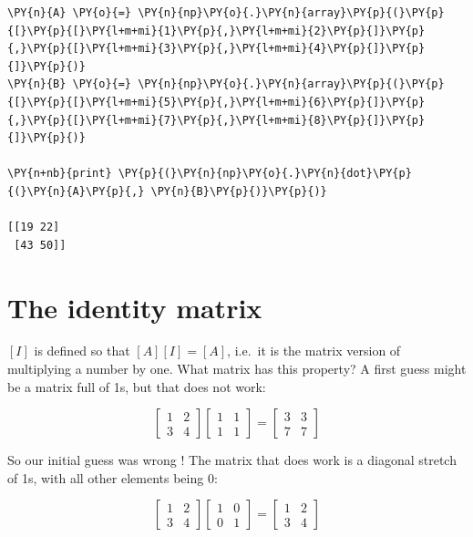 \begin{tcolorbox}[breakable, size=fbox, boxrule=1pt, pad at break*=1mm,colback=cellbackground, colframe=cellborder]
\begin{Verbatim}[commandchars=\\\{\}]
\PY{n}{A} \PY{o}{=} \PY{n}{np}\PY{o}{.}\PY{n}{array}\PY{p}{(}\PY{p}{[}\PY{p}{[}\PY{l+m+mi}{1}\PY{p}{,}\PY{l+m+mi}{2}\PY{p}{]}\PY{p}{,}\PY{p}{[}\PY{l+m+mi}{3}\PY{p}{,}\PY{l+m+mi}{4}\PY{p}{]}\PY{p}{]}\PY{p}{)}
\PY{n}{B} \PY{o}{=} \PY{n}{np}\PY{o}{.}\PY{n}{array}\PY{p}{(}\PY{p}{[}\PY{p}{[}\PY{l+m+mi}{5}\PY{p}{,}\PY{l+m+mi}{6}\PY{p}{]}\PY{p}{,}\PY{p}{[}\PY{l+m+mi}{7}\PY{p}{,}\PY{l+m+mi}{8}\PY{p}{]}\PY{p}{]}\PY{p}{)}

\PY{n+nb}{print} \PY{p}{(}\PY{n}{np}\PY{o}{.}\PY{n}{dot}\PY{p}{(}\PY{n}{A}\PY{p}{,} \PY{n}{B}\PY{p}{)}\PY{p}{)}

[[19 22]
 [43 50]]
    \end{Verbatim}
\end{tcolorbox}

\section{The identity matrix}\label{the-identity-matrix}

\([I]\) is defined so that \([A][I]=[A]\), i.e.~it is the matrix version
of multiplying a number by one. What matrix has this property? A first
guess might be a matrix full of 1s, but that does not work:

\[
\begin{bmatrix}
1 & 2 \\
3 & 4
\end{bmatrix}
\begin{bmatrix}
1 & 1 \\
1 & 1
\end{bmatrix}
=
\begin{bmatrix}
3 & 3 \\
7 & 7
\end{bmatrix}
\]

So our initial guess was wrong ! The matrix that does work is a diagonal
stretch of 1s, with all other elements being 0:

\[
\begin{bmatrix}
1 & 2 \\
3 & 4
\end{bmatrix}
\begin{bmatrix}
1 & 0 \\
0 & 1
\end{bmatrix}
=
\begin{bmatrix}
1 & 2 \\
3 & 4
\end{bmatrix}
\]

